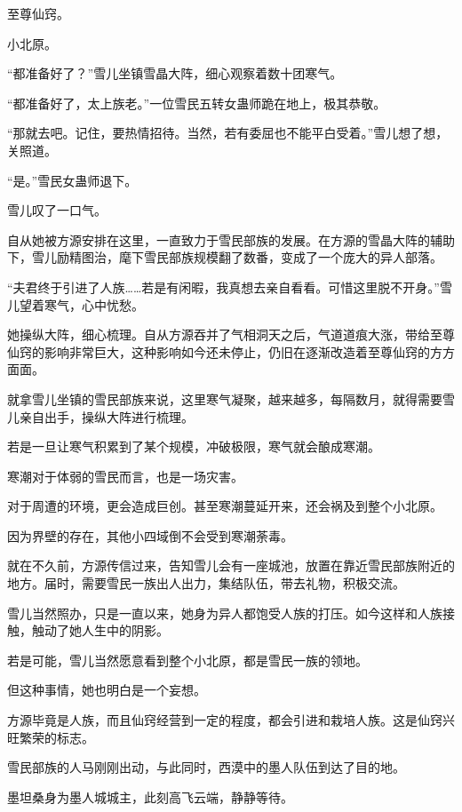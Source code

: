 
\begin{this_body}

至尊仙窍。

小北原。

“都准备好了？”雪儿坐镇雪晶大阵，细心观察着数十团寒气。

“都准备好了，太上族老。”一位雪民五转女蛊师跪在地上，极其恭敬。

“那就去吧。记住，要热情招待。当然，若有委屈也不能平白受着。”雪儿想了想，关照道。

“是。”雪民女蛊师退下。

雪儿叹了一口气。

自从她被方源安排在这里，一直致力于雪民部族的发展。在方源的雪晶大阵的辅助下，雪儿励精图治，麾下雪民部族规模翻了数番，变成了一个庞大的异人部落。

“夫君终于引进了人族……若是有闲暇，我真想去亲自看看。可惜这里脱不开身。”雪儿望着寒气，心中忧愁。

她操纵大阵，细心梳理。自从方源吞并了气相洞天之后，气道道痕大涨，带给至尊仙窍的影响非常巨大，这种影响如今还未停止，仍旧在逐渐改造着至尊仙窍的方方面面。

就拿雪儿坐镇的雪民部族来说，这里寒气凝聚，越来越多，每隔数月，就得需要雪儿亲自出手，操纵大阵进行梳理。

若是一旦让寒气积累到了某个规模，冲破极限，寒气就会酿成寒潮。

寒潮对于体弱的雪民而言，也是一场灾害。

对于周遭的环境，更会造成巨创。甚至寒潮蔓延开来，还会祸及到整个小北原。

因为界壁的存在，其他小四域倒不会受到寒潮荼毒。

就在不久前，方源传信过来，告知雪儿会有一座城池，放置在靠近雪民部族附近的地方。届时，需要雪民一族出人出力，集结队伍，带去礼物，积极交流。

雪儿当然照办，只是一直以来，她身为异人都饱受人族的打压。如今这样和人族接触，触动了她人生中的阴影。

若是可能，雪儿当然愿意看到整个小北原，都是雪民一族的领地。

但这种事情，她也明白是一个妄想。

方源毕竟是人族，而且仙窍经营到一定的程度，都会引进和栽培人族。这是仙窍兴旺繁荣的标志。

雪民部族的人马刚刚出动，与此同时，西漠中的墨人队伍到达了目的地。

墨坦桑身为墨人城城主，此刻高飞云端，静静等待。


\end{this_body}
